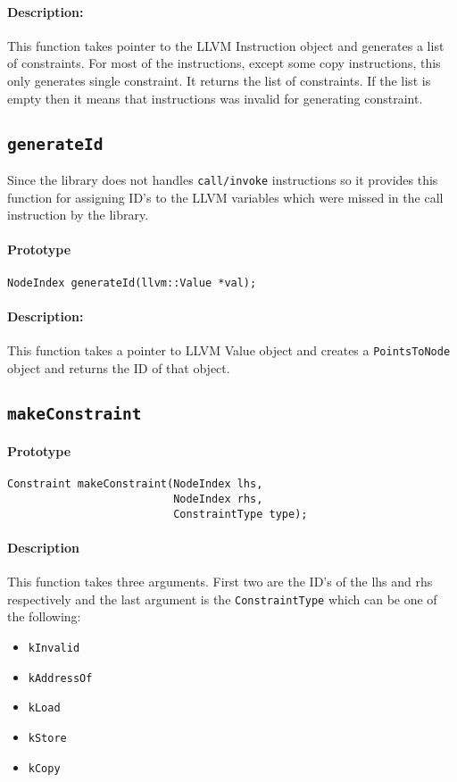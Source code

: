 \documentclass[a4paper,11pt]{report}
\begin{document}
\paragraph{Description:}
This function takes pointer to the LLVM Instruction object and generates a list
of constraints. For most of the instructions, except some copy instructions,
this only generates single constraint. It returns the list of constraints. If
the list is empty then it means that instructions was invalid for generating
constraint.

\subsection{\texttt{generateId}}
Since the library does not handles \texttt{call/invoke} instructions so it provides
this function for assigning ID's to the LLVM variables which were missed in the call
instruction by the library.

\paragraph{Prototype}
\begin{verbatim}
NodeIndex generateId(llvm::Value *val);
\end{verbatim}

\paragraph{Description:}
This function takes a pointer to LLVM Value object and creates a \texttt{PointsToNode}
object and returns the ID of that object.

\subsection{\texttt{makeConstraint}}
\paragraph{Prototype}
\begin{verbatim}
Constraint makeConstraint(NodeIndex lhs,
                          NodeIndex rhs,
                          ConstraintType type);
\end{verbatim}

\paragraph{Description}
This function takes three arguments. First two are the ID's of the lhs and rhs
respectively and the last argument is the \texttt{ConstraintType} which can be
one of the following:
\begin{itemize}
    \item \texttt{kInvalid}
    \item \texttt{kAddressOf}
    \item \texttt{kLoad}
    \item \texttt{kStore}
    \item \texttt{kCopy}
\end{itemize}
\end{document}
